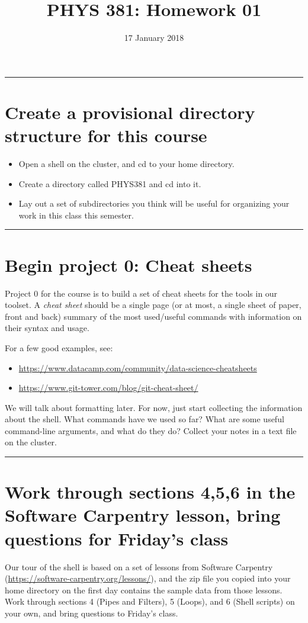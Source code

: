\documentclass{tufte-handout}
\date{17 January 2018}
\title{PHYS 381: Homework 01}
\begin{document}
\maketitle
\rule{\linewidth}{0.5pt}
\section{Create a provisional directory structure for this course}
\label{sec-1}
\begin{itemize}
\item Open a shell on the cluster, and cd to your home directory.
\item Create a directory called PHYS381 and cd into it.
\item Lay out a set of subdirectories you think will be useful for organizing your work in this class this semester.
\end{itemize}

\rule{\linewidth}{0.5pt}
\section{Begin project 0: Cheat sheets}
\label{sec-2}
Project 0 for the course is to build a set of cheat sheets for the tools in our toolset. A \emph{cheat sheet} should be a single page (or at most, a single sheet of paper, front and back) summary of the most used/useful commands with information on their syntax and usage.

For a few good examples, see:
\begin{itemize}
\item \url{https://www.datacamp.com/community/data-science-cheatsheets}
\item \url{https://www.git-tower.com/blog/git-cheat-sheet/}
\end{itemize}

We will talk about formatting later. For now, just start collecting the information about the shell. What commands have we used so far? What are some useful command-line arguments, and what do they do? Collect your notes in a text file on the cluster.

\rule{\linewidth}{0.5pt}
\section{Work through sections 4,5,6 in the Software Carpentry lesson, bring questions for Friday's class}
\label{sec-3}
Our tour of the shell is based on a set of lessons from Software Carpentry (\url{https://software-carpentry.org/lessons/}), and the zip file you copied into your home directory on the first day contains the sample data from those lessons. Work through sections 4 (Pipes and Filters), 5 (Loops), and 6 (Shell scripts) on your own, and bring questions to Friday's class.
\end{document}

